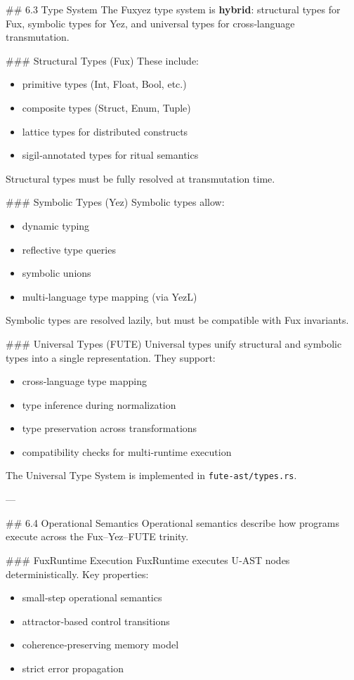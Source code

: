 \#\# 6.3 Type System  
The Fuxyez type system is \textbf{hybrid}: structural types for Fux, symbolic types for Yez, and universal types for cross‑language transmutation.

\#\#\# Structural Types (Fux)  
These include:  
\begin{itemize}
  \item primitive types (Int, Float, Bool, etc.)  
  \item composite types (Struct, Enum, Tuple)  
  \item lattice types for distributed constructs  
  \item sigil‑annotated types for ritual semantics
\end{itemize}

Structural types must be fully resolved at transmutation time.

\#\#\# Symbolic Types (Yez)  
Symbolic types allow:  
\begin{itemize}
  \item dynamic typing  
  \item reflective type queries  
  \item symbolic unions  
  \item multi‑language type mapping (via YezL)
\end{itemize}

Symbolic types are resolved lazily, but must be compatible with Fux invariants.

\#\#\# Universal Types (FUTE)  
Universal types unify structural and symbolic types into a single representation. They support:  
\begin{itemize}
  \item cross‑language type mapping  
  \item type inference during normalization  
  \item type preservation across transformations  
  \item compatibility checks for multi‑runtime execution
\end{itemize}

The Universal Type System is implemented in \texttt{fute-ast/types.rs}.

---

\#\# 6.4 Operational Semantics  
Operational semantics describe how programs execute across the Fux–Yez–FUTE trinity.

\#\#\# FuxRuntime Execution  
FuxRuntime executes U‑AST nodes deterministically.  
Key properties:  
\begin{itemize}
  \item small‑step operational semantics  
  \item attractor‑based control transitions  
  \item coherence‑preserving memory model  
  \item strict error propagation
\end{itemize}

